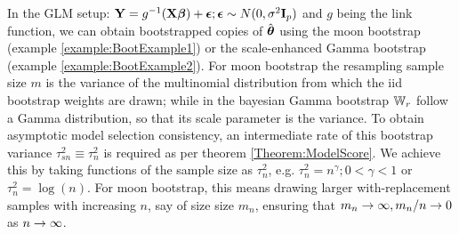 \begin{Example}
In the GLM setup: ${\mathbf{Y}} = g^{-1}( {\mathbf{X}} {\boldsymbol{\beta}} ) + {\boldsymbol{\epsilon}}; {\boldsymbol{\epsilon}} \sim N(0, \sigma^2 {\mathbf{I}}_p)$ and $g$ being the link function, we can obtain bootstrapped copies of $\hat {{\boldsymbol{\theta}}}$ using the moon bootstrap (example \ref{example:BootExample1}) or the scale-enhanced Gamma bootstrap (example \ref{example:BootExample2}). For moon bootstrap the resampling sample size $m$ is the variance of the multinomial distribution from which the iid bootstrap weights are drawn; while in the bayesian Gamma bootstrap ${\mathbb{W}}_r$ follow a Gamma distribution, so that its scale parameter is the variance. To obtain asymptotic model selection consistency, an intermediate rate of this bootstrap variance $\tau_{s n}^2 \equiv \tau_n^2$ is required as per theorem \ref{Theorem:ModelScore}. We achieve this by taking functions of the sample size as $\tau_n^2$, e.g. $\tau_n^2 = n^\gamma; 0 < \gamma < 1$ or $\tau_n^2 = \log (n)$. For moon bootstrap, this means drawing larger with-replacement samples with increasing $n$, say of size size $m_n$, ensuring that $m_n \rightarrow \infty, m_n / n \rightarrow 0$ as $n \rightarrow \infty$.
%

\end{Example}
